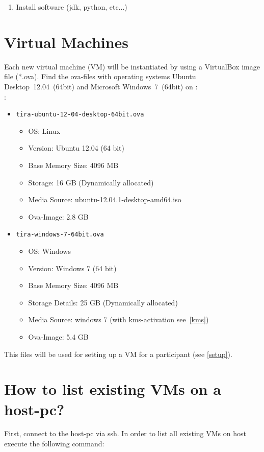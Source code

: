 \begin{enumerate}
\item Install software (jdk, python, etc...)
%
%
\end{enumerate}

\section{Virtual Machines}\label{ova}
Each new virtual machine (VM) will be instantiated by using a VirtualBox image file (*.ova).
Find the ova-files with operating systems Ubuntu Desktop~12.04~(64bit) and Microsoft Windows~7~(64bit) on :\\
:
\begin{itemize}
\item \texttt{tira-ubuntu-12-04-desktop-64bit.ova}
\begin{itemize}
\item OS: Linux
\item Version: Ubuntu 12.04 (64 bit)
\item Base Memory Size: 4096 MB
\item Storage: 16 GB (Dynamically allocated)
\item Media Source: ubuntu-12.04.1-desktop-amd64.iso
\item Ova-Image: 2.8 GB
\end{itemize}
\item \texttt{tira-windows-7-64bit.ova}
\begin{itemize}
\item OS: Windows
\item Version: Windows 7 (64 bit)
\item Base Memory Size: 4096 MB
\item Storage Details: 25 GB (Dynamically allocated)
\item Media Source: windows 7 (with kms-activation see~\ref{kms})
\item Ova-Image: 5.4 GB
\end{itemize}
\end{itemize}
This files will be used for setting up a VM for a participant (see \ref{setup}).


\section{How to list existing VMs on a host-pc?}\label{list}
First, connect to the host-pc via ssh. In order to list all existing VMs on host execute the following command:\\
\medskip\noindent

